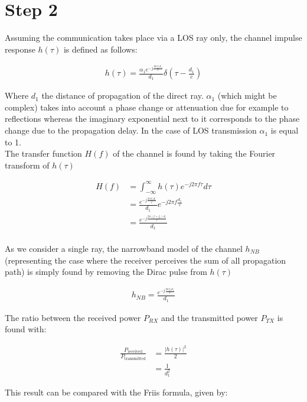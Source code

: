 \documentclass[10pt,a4paper]{ULBreport}
\begin{document}
\section{Step 2}

Assuming the communication takes place via a LOS ray only, the channel impulse response $h(\tau)$ is defined as follows:

\begin{align*}
    h(\tau) = \frac{\alpha_1 e^{-j\frac{2\pi f_cd_1}{c}}}{d_1} \delta(\tau - \frac{d_1}{c})
\end{align*}

Where $d_1$ the distance of propagation of the direct ray. $\alpha_1$ (which might be complex) takes into account a phase change or attenuation due for example to reflections whereas the imaginary exponential next to it corresponds to the phase change due to the propagation delay. In the case of LOS transmission $\alpha_1$ is equal to 1.\\
The transfer function $H(f)$ of the channel is found by taking the Fourier transform of $h(\tau)$

\begin{align*}
    H(f) &= \int_{-\infty}^{\infty} h(\tau) e^{-j2\pi f \tau} d\tau\\
    &= \frac{e^{-j\frac{2\pi f_c d_1}{c}}}{d_1}e^{-j2\pi f \frac{d_1}{c}}\\
    &= \frac{e^{-j \frac{2\pi (f+f_c)d_1}{c}}}{d_1}\\
\end{align*}

As we consider a single ray, the narrowband model of the channel $h_{NB}$ (representing the case where the receiver perceives the sum of all propagation path) is simply found by removing the Dirac pulse from $h(\tau)$

\begin{align*}
    h_{NB} = \frac{e^{-j \frac{2\pi f_cd_1}{c}}}{d_1}
\end{align*}

The ratio between the received power $P_{RX}$ and the transmitted power $P_{TX}$ is found with:

\begin{align}
    \frac{P_{\text{received}}}{P_{\text{transmitted}}} &= \frac{\left| h(\tau) \right|^2}{2} \nonumber\\
    &= \frac{1}{d_1^2}
    \label{eq:power_approx}
\end{align}

This result can be compared with the Friis formula, given by:
\end{document}
